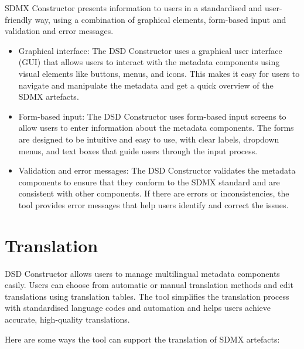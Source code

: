 \documentclass[
]{book}
\providecommand{\tightlist}{%
  \setlength{\itemsep}{0pt}\setlength{\parskip}{0pt}}
\theoremstyle{definition}
\theoremstyle{definition}
\theoremstyle{definition}
\theoremstyle{definition}
\theoremstyle{remark}
\begin{document}
SDMX Constructor presents information to users in a standardised and user-friendly way, using a combination of graphical elements, form-based input and validation and error messages.

\begin{itemize}
\tightlist
\item
  Graphical interface: The DSD Constructor uses a graphical user interface (GUI) that allows users to interact with the metadata components using visual elements like buttons, menus, and icons. This makes it easy for users to navigate and manipulate the metadata and get a quick overview of the SDMX artefacts.
\item
  Form-based input: The DSD Constructor uses form-based input screens to allow users to enter information about the metadata components. The forms are designed to be intuitive and easy to use, with clear labels, dropdown menus, and text boxes that guide users through the input process.
\item
  Validation and error messages: The DSD Constructor validates the metadata components to ensure that they conform to the SDMX standard and are consistent with other components. If there are errors or inconsistencies, the tool provides error messages that help users identify and correct the issues.
\end{itemize}

\hypertarget{translation}{%
\section{Translation}\label{translation}}

DSD Constructor allows users to manage multilingual metadata components easily. Users can choose from automatic or manual translation methods and edit translations using translation tables. The tool simplifies the translation process with standardised language codes and automation and helps users achieve accurate, high-quality translations.

Here are some ways the tool can support the translation of SDMX artefacts:
\end{document}
